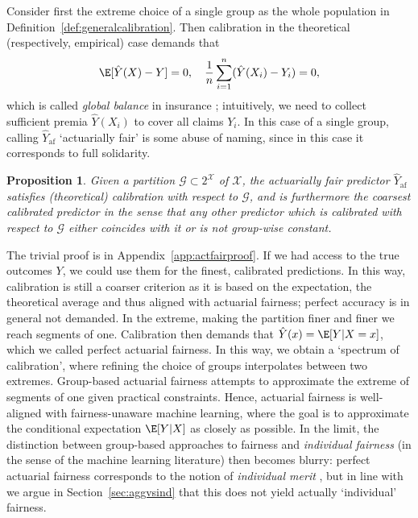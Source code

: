 \documentclass[11pt]{article} %
\makeatletter
\newcommand*{\ie}{i.e.\@\xspace}
\newcommand{\actfairpred}{\hat{Y}_{\mathrm{af}}}
\newtheorem{proposition}[theorem]{Proposition}
\makeatother
\begin{document}
  Consider first the extreme choice of a single group as the whole population in Definition~\ref{def:generalcalibration}. 
  Then calibration in the theoretical (respectively, empirical) case demands that  
\begin{align}
\E[\hat{Y}(X) - Y]=0, 
\quad \frac{1}{n} \sum_{i=1}^n (\hat{Y}(X_i) - Y_i)=0,
\end{align}
which is called \textit{global balance} in insurance \citep{denuit2021autocalibration}; intuitively, we need to collect sufficient premia $\hat{Y}(X_i)$ to cover all claims $Y_i$. In this case of a single group, calling $\actfairpred$ `actuarially fair' is some abuse of naming, since in this case it corresponds to full solidarity.
\begin{proposition}
\label{prop:actfair}
    Given a partition $\mathcal{G} \subset 2^{\mathcal{X}}$ of $\mathcal{X}$, the actuarially fair predictor $\actfairpred$ satisfies (theoretical) calibration with respect to $\mathcal{G}$, and is furthermore the coarsest calibrated predictor in the sense that any other predictor which is calibrated with respect to $\mathcal{G}$ either coincides with it or is not group-wise constant.
\end{proposition}
The trivial proof is in Appendix~\ref{app:actfairproof}.
If we had access to the true outcomes $Y$, we could use them for the finest, calibrated predictions. In this way, calibration is still a coarser criterion as it is based on the expectation, the theoretical average and thus aligned with actuarial fairness; perfect accuracy is in general not demanded.
In the extreme, making the partition finer and finer we reach segments of one. Calibration then demands that $\hat{Y}(x) = \E[Y|X=x]$, which we called perfect actuarial fairness.
In this way, we obtain a `spectrum of calibration', where refining the choice of groups interpolates between two extremes. Group-based actuarial fairness attempts to approximate the extreme of segments of one given practical constraints. Hence, actuarial fairness is well-aligned with fairness-unaware machine learning, where the goal is to approximate the conditional expectation $\E[Y|X]$ as closely as possible. In the limit, the distinction between group-based approaches to fairness and \textit{individual fairness} (in the sense of the machine learning literature) then becomes blurry: perfect actuarial fairness corresponds to the notion of \textit{individual merit} \citep{joseph2016fairness}, but in line with \citet{binns2020apparent} we argue in Section~\ref{sec:aggvsind} that this does not yield actually `individual' fairness.
\end{document}

